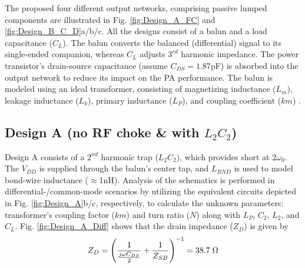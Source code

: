 \documentclass[conference]{IEEEtran}
\begin{document}
The proposed four different  output networks, comprising passive lumped components are illustrated in Fig. \ref{fig:Design_A_FC} and \ref{fig:Design_B_C_D}a/b/c. 
All the designs consist of a balun and a load capacitance ($C_L$). The balun converts the balanced (differential) signal to its single-ended companion, whereas $C_L$ adjusts $3^{rd}$ harmonic impedance. The power transistor's drain-source capacitance (assume $C_{DS}=1.87$pF) is absorbed into the output network to reduce its impact on the PA performance. The balun is modeled using an ideal transformer, consisting of magnetizing inductance ($L_m$), leakage inductance ($L_k$), primary inductance ($L_P$), and coupling coefficient ($km$) \cite{Transformer_model}. 

\subsection{Design A (no RF choke \& with $L_2C_2$)}
Design A consists of a $2^{nd}$ harmonic trap ($L_2C_2$), which provides short at $2\omega_0$. The $V_{DD}$ is supplied through the balun's center tap, and $L_{BND}$ is used to model bond-wire inductance ($\approx$1nH). Analysis of the schematics is performed in differential-/common-mode scenarios by utilizing the equivalent circuits depicted in Fig. \ref{fig:Design_A}b/c, respectively, to calculate the unknown parameters: transformer's coupling factor ($km$) and turn ratio ($N$) along with  $L_P$, $C_2$, $L_2$, and $C_L$. Fig. \ref{fig:Design_A_Diff} shows that the drain impedance ($Z_D$) is given by
\vspace{-0.05in}
\begin{equation}
	Z_D=\left(\frac{1}{\frac{j\omega C_{DS}}{2}}+\frac{1}{Z_{SB}}\right)^{-1}=38.7 \hspace{1mm} \Omega
	\label{eqn:ZD}
\end{equation}
\end{document}
